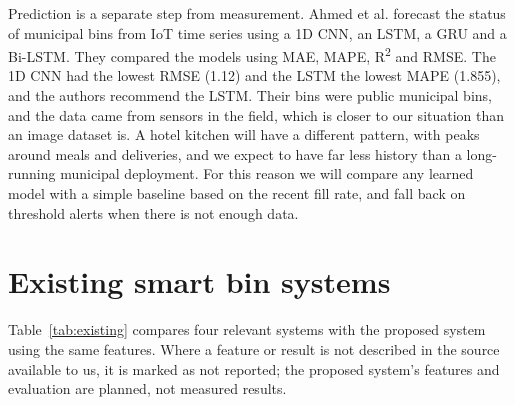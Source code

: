 \documentclass[12pt,a4paper]{report}
\begin{document}
Prediction is a separate step from measurement. Ahmed et al. \cite{ahmed} forecast the status of municipal bins from IoT time series using a 1D CNN, an LSTM, a GRU and a Bi-LSTM. They compared the models using MAE, MAPE, R\textsuperscript{2} and RMSE. The 1D CNN had the lowest RMSE (1.12) and the LSTM the lowest MAPE (1.855), and the authors recommend the LSTM. Their bins were public municipal bins, and the data came from sensors in the field, which is closer to our situation than an image dataset is. A hotel kitchen will have a different pattern, with peaks around meals and deliveries, and we expect to have far less history than a long-running municipal deployment. For this reason we will compare any learned model with a simple baseline based on the recent fill rate, and fall back on threshold alerts when there is not enough data.

\section{Existing smart bin systems}

Table~\ref{tab:existing} compares four relevant systems with the proposed system using the same features. Where a feature or result is not described in the source available to us, it is marked as not reported; the proposed system's features and evaluation are planned, not measured results.
\end{document}

